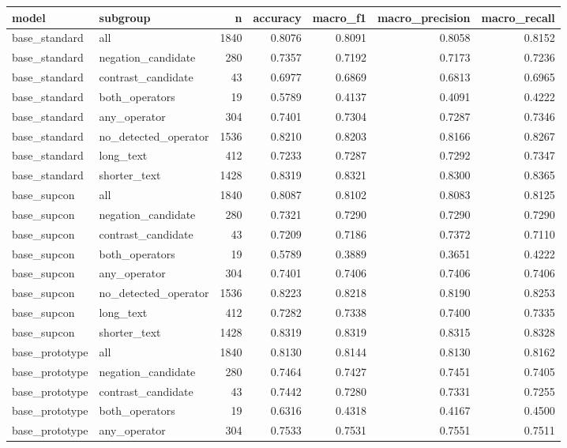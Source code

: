 \begin{tabular}{llrrrrr}
\toprule
model & subgroup & n & accuracy & macro\_f1 & macro\_precision & macro\_recall \\
\midrule
base\_standard & all & 1840 & 0.8076 & 0.8091 & 0.8058 & 0.8152 \\
base\_standard & negation\_candidate & 280 & 0.7357 & 0.7192 & 0.7173 & 0.7236 \\
base\_standard & contrast\_candidate & 43 & 0.6977 & 0.6869 & 0.6813 & 0.6965 \\
base\_standard & both\_operators & 19 & 0.5789 & 0.4137 & 0.4091 & 0.4222 \\
base\_standard & any\_operator & 304 & 0.7401 & 0.7304 & 0.7287 & 0.7346 \\
base\_standard & no\_detected\_operator & 1536 & 0.8210 & 0.8203 & 0.8166 & 0.8267 \\
base\_standard & long\_text & 412 & 0.7233 & 0.7287 & 0.7292 & 0.7347 \\
base\_standard & shorter\_text & 1428 & 0.8319 & 0.8321 & 0.8300 & 0.8365 \\
base\_supcon & all & 1840 & 0.8087 & 0.8102 & 0.8083 & 0.8125 \\
base\_supcon & negation\_candidate & 280 & 0.7321 & 0.7290 & 0.7290 & 0.7290 \\
base\_supcon & contrast\_candidate & 43 & 0.7209 & 0.7186 & 0.7372 & 0.7110 \\
base\_supcon & both\_operators & 19 & 0.5789 & 0.3889 & 0.3651 & 0.4222 \\
base\_supcon & any\_operator & 304 & 0.7401 & 0.7406 & 0.7406 & 0.7406 \\
base\_supcon & no\_detected\_operator & 1536 & 0.8223 & 0.8218 & 0.8190 & 0.8253 \\
base\_supcon & long\_text & 412 & 0.7282 & 0.7338 & 0.7400 & 0.7335 \\
base\_supcon & shorter\_text & 1428 & 0.8319 & 0.8319 & 0.8315 & 0.8328 \\
base\_prototype & all & 1840 & 0.8130 & 0.8144 & 0.8130 & 0.8162 \\
base\_prototype & negation\_candidate & 280 & 0.7464 & 0.7427 & 0.7451 & 0.7405 \\
base\_prototype & contrast\_candidate & 43 & 0.7442 & 0.7280 & 0.7331 & 0.7255 \\
base\_prototype & both\_operators & 19 & 0.6316 & 0.4318 & 0.4167 & 0.4500 \\
base\_prototype & any\_operator & 304 & 0.7533 & 0.7531 & 0.7551 & 0.7511 \\

\end{tabular}
